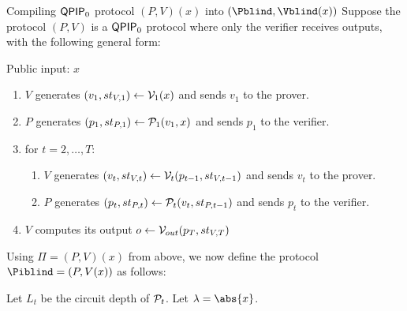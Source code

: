 \begin{protocol}{Compiling $\operatorname{\mathsf{QPIP}}_0$ protocol $(P, V)(x)$ into $(\Pblind, \Vblind(x))$}
	Suppose the protocol $(P, V)$ is a $\operatorname{\mathsf{QPIP}}_0$ protocol where only the verifier receives outputs, with the following general form:
	
	Public input: $x$
	\begin{enumerate}
		\item $V$ generates $(v_1, st_{V, 1})\leftarrow\mathcal{V}_1(x)$ and sends $v_1$ to the prover.
		\item $P$ generates $(p_1, st_{P, 1})\leftarrow\mathcal{P}_1(v_1, x)$ and sends $p_1$ to the verifier.
		\item for $t=2,\ldots,T$:
		\begin{enumerate}
			\item $V$ generates $(v_t, st_{V, t})\leftarrow\mathcal{V}_t(p_{t-1}, st_{V, t-1})$ and sends $v_t$ to the prover.
			\item $P$ generates $(p_t, st_{P, t})\leftarrow\mathcal{P}_t(v_t, st_{P, t-1})$ and sends $p_t$ to the verifier.
		\end{enumerate}
		\item $V$ computes its output $o\leftarrow\mathcal{V}_{out}(p_T, st_{V, T})$
	\end{enumerate}

	Using $\Pi=(P, V)(x)$ from above, we now define the protocol $\Piblind=(P, V(x))$ as follows:

	Let $L_t$ be the circuit depth of $\mathcal{P}_t$.
	Let $\lambda=\abs{x}$.


\end{protocol}
